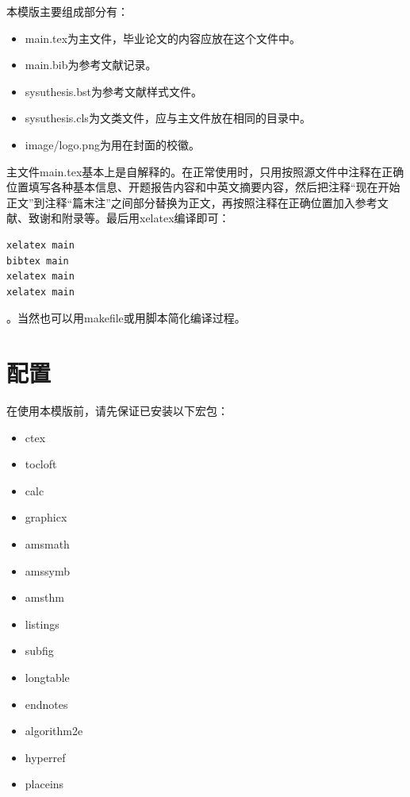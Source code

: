 \documentclass{sysuthesis}
\begin{document}
本模版主要组成部分有：

\begin{itemize}
\item {\ttfamily main.tex}为主文件，毕业论文的内容应放在这个文件中。
\item {\ttfamily main.bib}为参考文献记录。
\item {\ttfamily sysuthesis.bst}为参考文献样式文件。
\item {\ttfamily sysuthesis.cls}为文类文件，应与主文件放在相同的目录中。
\item {\ttfamily image/logo.png}为用在封面的校徽。
\end{itemize}

主文件{\ttfamily main.tex}基本上是自解释的。在正常使用时，只用按照源文件中注释在正确位置填写各种基本信息、开题报告内容和中英文摘要内容，然后把注释``现在开始正文''到注释``篇末注''之间部分替换为正文，再按照注释在正确位置加入参考文献、致谢和附录等。最后用{\ttfamily xelatex}编译即可：

\begin{lstlisting}[language=bash, keywordstyle=\color{blue}\bfseries, basicstyle=\ttfamily, breaklines=true, frame=shadowbox]
xelatex main
bibtex main
xelatex main
xelatex main
\end{lstlisting}
。当然也可以用{\ttfamily makefile}或用脚本简化编译过程。

\section{配置}

在使用本模版前，请先保证已安装以下宏包：

\begin{itemize}
\item {\ttfamily ctex}
\item {\ttfamily tocloft}
\item {\ttfamily calc}
\item {\ttfamily graphicx}
\item {\ttfamily amsmath}
\item {\ttfamily amssymb}
\item {\ttfamily amsthm}
\item {\ttfamily listings}
\item {\ttfamily subfig}
\item {\ttfamily longtable}
\item {\ttfamily endnotes}
\item {\ttfamily algorithm2e}
\item {\ttfamily hyperref}
\item {\ttfamily placeins}
\end{itemize}
\end{document}
